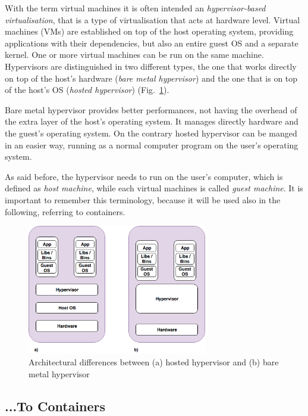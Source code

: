 \documentclass[a4paper,12pt]{article}
\def\myfig#1{Fig.~#1\xspace}
\begin{document}
With the term virtual machines it is often intended an \textit{hypervisor-based
virtualisation}, that is a type of virtualisation that acts at hardware level.
Virtual machines (VMs) are established on top of the host operating system,
providing applications with their dependencies, but also an entire guest OS and
a separate kernel. One or more virtual machines can be run on the same machine.
Hypervisors are distinguished in two different types, the one that works
directly on top of the host's hardware (\textit{bare metal hypervisor}) and the
one that is on top of the host's OS (\textit{hosted hypervisor})
(\myfig{\ref{fig:hypervisor_difference}}). \par Bare metal hypervisor provides
better performances, not having the overhead of the extra layer of the host's
operating system. It manages directly hardware and the guest's operating system.
On the contrary hosted hypervisor can be manged in an easier way, running as a
normal computer program on the user's operating
system\cite{types_of_hypervisor}. \par As said before, the hypervisor needs to
run on the user's computer, which is defined as \textit{host machine}, while
each virtual machines is called \textit{guest machine}. It is important to
remember this terminology, because it will be used also in the following,
referring to containers. 

\begin{figure}[ht!]
  \centerline{\includegraphics[width=0.7\textwidth]{difference_bare_metal_hosted_hypervisor.png}}
  \caption{Architectural differences between (a) hosted hypervisor and (b) bare metal hypervisor}
  \label{fig:hypervisor_difference}
  \end{figure}


\subsection{...To Containers}
\end{document}

